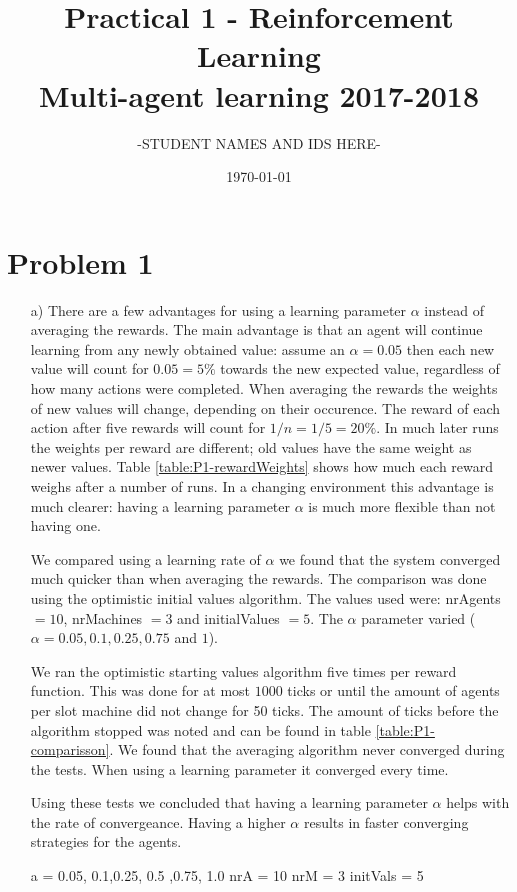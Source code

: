 \documentclass[12pt]{article}
\title{Practical 1 - Reinforcement Learning \\
	\large Multi-agent learning 2017-2018}
\author{-STUDENT NAMES AND IDS HERE-}
\date{\today}
\begin{document}
\maketitle

\section*{Problem 1}\label{sec:p1}

\begin{enumerate}
	\item[a)] 						%
	There are a few advantages for using a learning parameter $\alpha$ instead of averaging the rewards.
	The main advantage is that an agent will continue learning from any newly obtained value:
	assume an $\alpha = 0.05$ then each new value will count for $0.05 = 5\%$ towards the new expected value, regardless of how many actions were completed.
	When averaging the rewards the weights of new values will change, depending on their occurence.
	The reward of each action after five rewards will count for $1/n = 1/5 = 20\%$.
	In much later runs the weights per reward are different; old values have the same weight as newer values.
	Table \ref{table:P1-rewardWeights} shows how much each reward weighs after a number of runs.
	In a changing environment this advantage is much clearer:
	having a learning parameter $\alpha$ is much more flexible than not having one.

	We compared using a learning rate of $\alpha$ we found that the system converged much quicker than when averaging the rewards.
	The comparison was done using the optimistic initial values algorithm.
	The values used were:  nrAgents $= 10$, nrMachines $=3$ and initialValues $=5$.
	The $\alpha$ parameter varied ($\alpha = 0.05, 0.1, 0.25, 0.75$ and $1$).

	We ran the optimistic starting values algorithm five times per reward function.
	This was done for at most $1000$ ticks or until the amount of agents per slot machine did not change for 50 ticks.
	The amount of ticks before the algorithm stopped was noted and can be found in table \ref{table:P1-comparisson}.
	We found that the averaging algorithm never converged during the tests.
	When using a learning parameter it converged every time.

	Using these tests we concluded that having a learning parameter $\alpha$ helps with the rate of convergeance.
	Having a higher $\alpha$ results in faster converging strategies for the agents.


a = 0.05, 0.1,0.25, 0.5 ,0.75, 1.0
nrA = 10
nrM = 3
initVals = 5

\end{enumerate}
\end{document}
